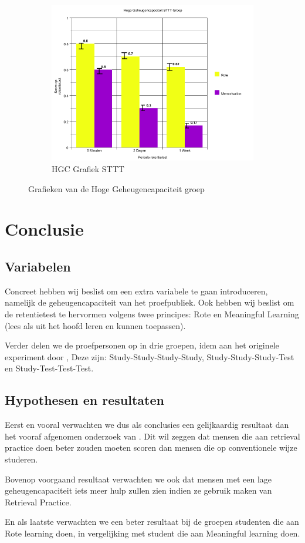 \documentclass{hogent-article}
\begin{document}
\begin{figure}[H]
\begin{subfigure}{0.4\textwidth}
		\includegraphics[width=\linewidth]{grafiek5}
		\caption{HGC Grafiek STTT}
	\end{subfigure}
	\caption{Grafieken van de Hoge Geheugencapaciteit groep}
\end{figure}

\section{Conclusie}

\subsection{Variabelen}
Concreet hebben wij beslist om een extra variabele te gaan introduceren, namelijk de geheugencapaciteit van het proefpubliek. Ook hebben wij beslist om de retentietest te hervormen volgens twee principes: Rote en Meaningful Learning (lees als uit het hoofd leren en kunnen toepassen).\\
\par
\noindent    
Verder delen we de proefpersonen op in drie groepen, idem aan het originele experiment door \cite{Henry2006} , Deze zijn: Study-Study-Study-Study, Study-Study-Study-Test  en Study-Test-Test-Test. 

\subsection{Hypothesen en resultaten}

\noindent
Eerst en vooral verwachten we dus als conclusies een gelijkaardig resultaat dan het vooraf afgenomen onderzoek van \cite{Henry2006}. Dit wil zeggen dat mensen die aan retrieval practice doen beter zouden moeten scoren dan mensen die op conventionele wijze studeren.\\
\par
\noindent
Bovenop voorgaand resultaat verwachten we ook dat mensen met een lage geheugencapaciteit iets meer hulp zullen zien indien ze gebruik maken van Retrieval Practice.\\
\par
\noindent
En als laatste verwachten we een beter resultaat bij de groepen studenten die aan Rote learning doen, in vergelijking met student die aan Meaningful learning doen.
\end{document}
